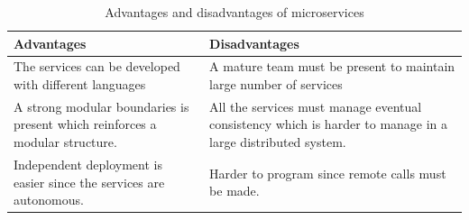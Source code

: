     \begin{table}[h!]
        \centering
        \begin{tabular}{|p{9cm}|p{7.5cm}|}
            \hline
                \textbf{Advantages}  & \textbf{Disadvantages}\\
            \hline
                The services can be developed with different languages & 
                A mature team must be present to maintain large number of services \\
            \hline
                A strong modular boundaries is present which reinforces a modular
                structure.
                & All the services must manage eventual consistency which is
                harder to manage in a large distributed system.\\
            \hline
                 Independent deployment is easier since the services are
                 autonomous. & Harder to program since remote calls must be made.\\
            \hline
        \end{tabular}
        \caption{Advantages and disadvantages of microservices \cite{FowlerMartin}}
        \label{table:Advantages and disadvantages of microservices}     
\end{table}    


